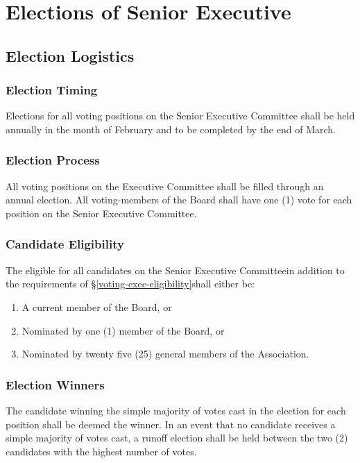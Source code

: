 \chapter{Elections of Senior Executive}

\section{Election Logistics}

\subsection{Election Timing}
Elections for all voting positions on the Senior Executive Committee 
shall be held annually in the month of February and to be completed by the 
end of March.

\subsection{Election Process}
All voting positions on the Executive Committee shall be filled 
through an annual election. All voting-members of the Board
shall have one (1) vote for each position on the Senior Executive
Committee.

\subsection{Candidate Eligibility}
The eligible for all candidates on the Senior Executive 
Committee\textemdash in addition to the requirements of 
\S\ref{voting-exec-eligibility}\textemdash shall either be:
\begin{enumerate}
    
    \item A current member of the Board, or
    
    \item Nominated by one (1) member of the Board, or
    
    \item Nominated by twenty five (25) general members of the Association.

\end{enumerate}

\subsection{Election Winners}
The candidate winning the simple majority of votes cast in the election for 
each position shall be deemed the winner. In an event that no candidate
receives a simple majority of votes cast, a runoff election shall be held
between the two (2) candidates with the highest number of votes.
